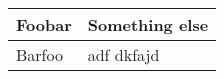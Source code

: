 \documentclass[11pt]{article}
\newlength{\bMargin}
\newlength{\bWidth}
\newlength{\bHeight}
\newlength{\bCellWidth}
\newlength{\bCellHeight}
\begin{document}
\setlength{\bMargin}{0.25in}
\setlength{\bCellPadding}{10pt}
\setlength{\bWidth}{0.5\dimexpr\textwidth-\bMargin}
\setlength{\bHeight}{0.5\dimexpr\textheight-\bMargin}
\setlength{\bCellWidth}{0.2\dimexpr\bWidth-6\arrayrulewidth}
\setlength{\bCellHeight}{0.2\dimexpr\bHeight-6\arrayrulewidth}

\begin{tabular}{|P|P|}
\hline
Foobar & Something else \\
\hline
Barfoo & adf dkfajd \\
\hline
\end{tabular}
\end{document}
